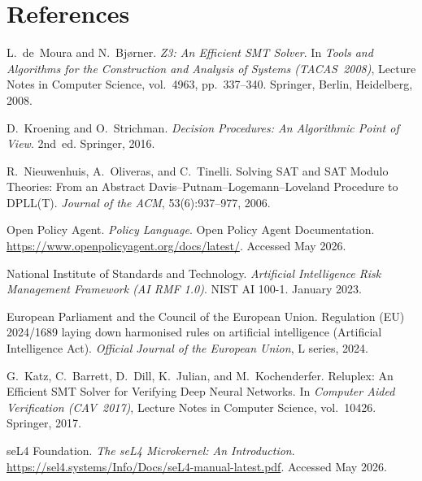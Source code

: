 \documentclass[12pt,a4paper,oneside]{report}
\begin{document}
\chapter*{References}

\begin{enumerate}[label={[\arabic*]}]
  \item L.~de~Moura and N.~Bj\o{}rner. \textit{Z3: An Efficient SMT Solver}.
        In \textit{Tools and Algorithms for the Construction and Analysis of
        Systems (TACAS~2008)}, Lecture Notes in Computer Science, vol.~4963,
        pp.~337--340. Springer, Berlin, Heidelberg, 2008.

  \item D.~Kroening and O.~Strichman. \textit{Decision Procedures: An
        Algorithmic Point of View}. 2nd~ed. Springer, 2016.

  \item R.~Nieuwenhuis, A.~Oliveras, and C.~Tinelli. Solving SAT and SAT
        Modulo Theories: From an Abstract Davis--Putnam--Logemann--Loveland
        Procedure to DPLL(T). \textit{Journal of the ACM}, 53(6):937--977,
        2006.

  \item Open Policy Agent. \textit{Policy Language}. Open Policy Agent
        Documentation. \url{https://www.openpolicyagent.org/docs/latest/}.
        Accessed May 2026.

  \item National Institute of Standards and Technology. \textit{Artificial
        Intelligence Risk Management Framework (AI RMF 1.0)}. NIST AI 100-1.
        January 2023.

  \item European Parliament and the Council of the European Union. Regulation
        (EU) 2024/1689 laying down harmonised rules on artificial intelligence
        (Artificial Intelligence Act). \textit{Official Journal of the European
        Union}, L series, 2024.

  \item G.~Katz, C.~Barrett, D.~Dill, K.~Julian, and M.~Kochenderfer.
        Reluplex: An Efficient SMT Solver for Verifying Deep Neural Networks.
        In \textit{Computer Aided Verification (CAV~2017)}, Lecture Notes in
        Computer Science, vol.~10426. Springer, 2017.

  \item seL4 Foundation. \textit{The seL4 Microkernel: An Introduction}.
        \url{https://sel4.systems/Info/Docs/seL4-manual-latest.pdf}.
        Accessed May 2026.


\end{enumerate}
\end{document}
